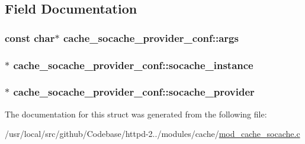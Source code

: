 \subsection{Field Documentation}
\subsubsection[{\texorpdfstring{args}{args}}]{\setlength{\rightskip}{0pt plus 5cm}const char$\ast$ cache\+\_\+socache\+\_\+provider\+\_\+conf\+::args}\hypertarget{structcache__socache__provider__conf_a41f0a22b95ee1c07fcde29e2ef2ce1db}{}\label{structcache__socache__provider__conf_a41f0a22b95ee1c07fcde29e2ef2ce1db}
\subsubsection[{\texorpdfstring{socache\+\_\+instance}{socache_instance}}]{$\ast$ cache\+\_\+socache\+\_\+provider\+\_\+conf\+::socache\+\_\+instance}\hypertarget{structcache__socache__provider__conf_af25944837e818cb3d6bac537a9bf9023}{}\label{structcache__socache__provider__conf_af25944837e818cb3d6bac537a9bf9023}
\subsubsection[{\texorpdfstring{socache\+\_\+provider}{socache_provider}}]{$\ast$ cache\+\_\+socache\+\_\+provider\+\_\+conf\+::socache\+\_\+provider}\hypertarget{structcache__socache__provider__conf_adfc2652c45e2f5149307e7f84a6acef3}{}\label{structcache__socache__provider__conf_adfc2652c45e2f5149307e7f84a6acef3}


The documentation for this struct was generated from the following file\+:\begin{DoxyCompactItemize}
\item 
/usr/local/src/github/\+Codebase/httpd-\/2../modules/cache/\hyperlink{modules_2cache_2mod__cache__socache_8c}{mod\+\_\+cache\+\_\+socache.\+c}\end{DoxyCompactItemize}
